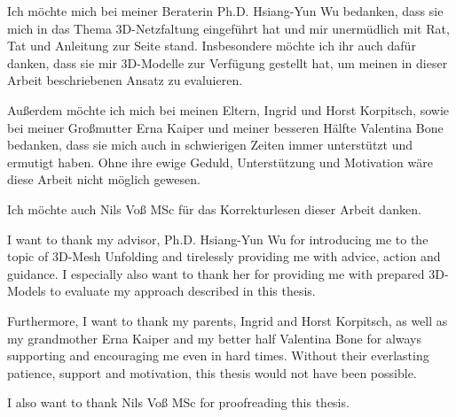 \documentclass[draft,final]{vutinfth} %
\begin{document}
\frontmatter %

\addstatementpage

\begin{danksagung*}
Ich möchte mich bei meiner Beraterin Ph.D. Hsiang-Yun Wu bedanken, dass sie mich in das Thema 3D-Netzfaltung eingeführt hat und mir unermüdlich mit Rat, Tat und Anleitung zur Seite stand. Insbesondere möchte ich ihr auch dafür danken, dass sie mir 3D-Modelle zur Verfügung gestellt hat, um meinen in dieser Arbeit beschriebenen Ansatz zu evaluieren. 

Außerdem möchte ich mich bei meinen Eltern, Ingrid und Horst Korpitsch, sowie bei meiner Großmutter Erna Kaiper und meiner besseren Hälfte Valentina Bone bedanken, dass sie mich auch in schwierigen Zeiten immer unterstützt und ermutigt haben. Ohne ihre ewige Geduld, Unterstützung und Motivation wäre diese Arbeit nicht möglich gewesen.

Ich möchte auch Nils Voß MSc für das Korrekturlesen dieser Arbeit danken.
\end{danksagung*}

\begin{acknowledgements*}
I want to thank my advisor, Ph.D. Hsiang-Yun Wu for introducing me to the topic of 3D-Mesh Unfolding and tirelessly providing me with advice, action and guidance. I especially also want to thank her for providing me with prepared 3D-Models to evaluate my approach described in this thesis. 

Furthermore, I want to thank my parents, Ingrid and Horst Korpitsch, as well as my grandmother Erna Kaiper and my better half Valentina Bone for always supporting and encouraging me even in hard times. Without their everlasting patience, support and motivation, this thesis would not have been possible.

I also want to thank Nils Voß MSc for proofreading this thesis.
\end{acknowledgements*}
\end{document}
